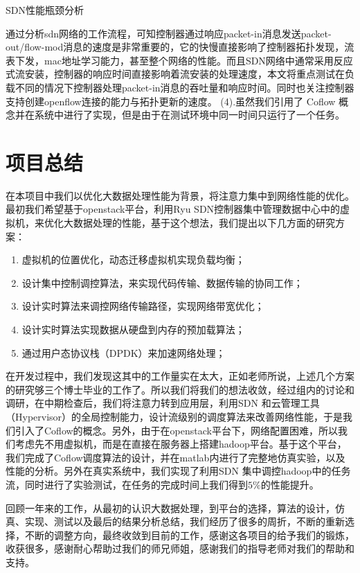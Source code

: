 \documentclass[a4paper, 11pt]{article}                                                   %
\begin{document}
\begin{CJK*}{UTF8}{song}
SDN性能瓶颈分析

通过分析sdn网络的工作流程，可知控制器通过响应packet-in消息发送packet-out/flow-mod消息的速度是非常重要的，它的快慢直接影响了控制器拓扑发现，流表下发，mac地址学习能力，甚至整个网络的性能。而且SDN网络中通常采用反应式流安装，控制器的响应时间直接影响着流安装的处理速度，本文将重点测试在负载不同的情况下控制器处理packet-in消息的吞吐量和响应时间。同时也关注控制器支持创建openflow连接的能力与拓扑更新的速度。
(4).虽然我们引用了 Coflow 概念并在系统中进行了实现，但是由于在测试环境中同一时间只运行了一个任务。
\section{项目总结}
在本项目中我们以优化大数据处理性能为背景，将注意力集中到网络性能的优化。最初我们希望基于openstack平台，利用Ryu SDN控制器集中管理数据中心中的虚拟机，来优化大数据处理的性能，基于这个想法，我们提出以下几方面的研究方案：

\begin{enumerate}
  \item 虚拟机的位置优化，动态迁移虚拟机实现负载均衡；
  \item 设计集中控制调控算法，来实现代码传输、数据传输的协同工作；
  \item 设计实时算法来调控网络传输路径，实现网络带宽优化；
  \item 设计实时算法实现数据从硬盘到内存的预加载算法；
  \item 通过用户态协议栈（DPDK）来加速网络处理；
\end{enumerate}
在开发过程中，我们发现这其中的工作量实在太大，正如老师所说，上述几个方案的研究够三个博士毕业的工作了。所以我们将我们的想法收敛，经过组内的讨论和调研，在中期检查后，我们将注意力转到应用层，利用SDN 和云管理工具（Hypervisor）的全局控制能力，设计流级别的调度算法来改善网络性能，于是我们引入了Coflow的概念。另外，由于在openstack平台下，网络配置困难，所以我们考虑先不用虚拟机，而是在直接在服务器上搭建hadoop平台。基于这个平台，我们完成了Coflow调度算法的设计，并在matlab内进行了完整地仿真实验，以及性能的分析。另外在真实系统中，我们实现了利用SDN 集中调控hadoop中的任务流，同时进行了实验测试，在任务的完成时间上我们得到$5\%$的性能提升。

回顾一年来的工作，从最初的认识大数据处理，到平台的选择，算法的设计，仿真、实现、测试以及最后的结果分析总结，我们经历了很多的周折，不断的重新选择，不断的调整方向，最终收敛到目前的工作，感谢这各项目的给予我们的锻炼，收获很多，感谢耐心帮助过我们的师兄师姐，感谢我们的指导老师对我们的帮助和支持。


\nocite{*}
%



\end{CJK*}
\end{document}

